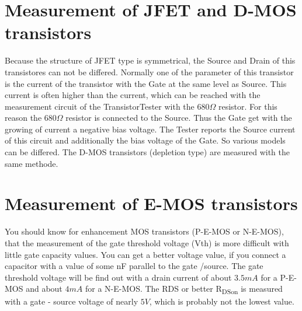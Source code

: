 \section{Measurement of JFET and D-MOS transistors}
Because the structure of JFET type is symmetrical, the Source and Drain of this transistores can not
be differed.
Normally one of the parameter of this transistor is the current of the transistor with the Gate at the same level as Source.
This current is often higher than the current, which can be reached with the measurement circuit of the TransistorTester
with the \(680\Omega\) resistor.
For this reason the \(680\Omega\) resistor is connected to the Source. Thus the Gate get with the growing of current a negative
bias voltage.
The Tester reports the Source current of this circuit and additionally the bias voltage of the Gate.
So various models can be differed.
The D-MOS transistors (depletion type) are measured with the same methode.

\section{Measurement of E-MOS transistors}
You should know for enhancement MOS transistors (P-E-MOS or N-E-MOS), that the measurement of the gate threshold voltage (Vth)
is more difficult with little gate capacity values. You can get a better voltage value, if you connect a capacitor with a value
of some nF parallel to the gate /source.
The gate threshold voltage will be find out with a drain current of about \(3.5mA\) for a P-E-MOS and about \(4mA\) for a N-E-MOS.
The RDS or better R\textsubscript{DSon} is measured with a gate - source voltage of nearly \(5V\), which is probably not the lowest value.

